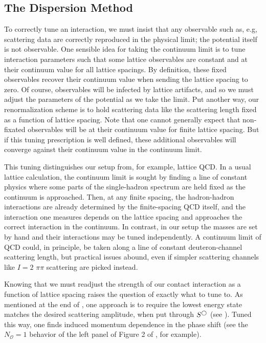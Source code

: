 \subsection{The Dispersion Method}\label{sec:dispersion}

To correctly tune an interaction, we must insist that any observable such as, e.g, scattering data are correctly reproduced in the physical limit; the potential itself is not observable.
One sensible idea for taking the continuum limit is to tune interaction parameters such that some lattice observables are constant and at their continuum value for all lattice spacings.
By definition, these fixed observables recover their continuum value when sending the lattice spacing to zero.
Of course, observables will be infected by lattice artifacts, and so we must adjust the parameters of the potential as we take the limit.
Put another way, our renormalization scheme is to hold scattering data like the scattering length fixed as a function of lattice spacing.
Note that one cannot generally expect that non-fixated observables will be at their continuum value for finite lattice spacing.
But if this tuning prescription is well defined, these additional observables will converge against their continuum value in the continuum limit.

This tuning distinguishes our setup from, for example, lattice QCD.
In a usual lattice calculation, the continuum limit is sought by finding a line of constant physics where some parts of the single-hadron spectrum are held fixed as the continuum is approached.
Then, at any finite spacing, the hadron-hadron interactions are already determined by the finite-spacing QCD itself, and the interaction one measures depends on the lattice spacing and approaches the correct interaction in the continuum.
In contrast, in our setup the masses are set by hand and their interactions may be tuned independently.
A continuum limit of QCD could, in principle, be taken along a line of constant deuteron-channel scattering length, but practical issues abound, even if simpler scattering channels like $I=2$ $\pi\pi$ scattering are picked instead.

Knowing that we must readjust the strength of our contact interaction as a function of lattice spacing raises the question of exactly what to tune to.
As mentioned at the end of , one approach is to require the lowest energy state matches the desired scattering amplitude, when put through $S^{\bigcirc}$ (see ).
Tuned this way, one finds induced momentum dependence in the phase shift (see the $N_\mathcal{O}=1$ behavior of the left panel of Figure 2 of , for example).

